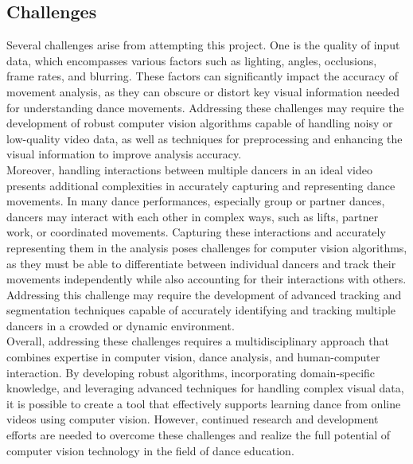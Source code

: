 \subsection{Challenges}
\indent Several challenges arise from attempting this project. One is the quality of input data, which 
encompasses various factors such as lighting, angles, occlusions, frame rates, and blurring. These 
factors can significantly impact the accuracy of movement analysis, as they can obscure or distort 
key visual information needed for understanding dance movements. Addressing these challenges may 
require the development of robust computer vision algorithms capable of handling noisy or low-quality 
video data, as well as techniques for preprocessing and enhancing the visual information to improve 
analysis accuracy.
\\
\indent Moreover, handling interactions between multiple dancers in an ideal video presents additional 
complexities in accurately capturing and representing dance movements. In many dance performances, 
especially group or partner dances, dancers may interact with each other in complex ways, such as 
lifts, partner work, or coordinated movements. Capturing these interactions and accurately 
representing them in the analysis poses challenges for computer vision algorithms, as they must be 
able to differentiate between individual dancers and track their movements independently while also 
accounting for their interactions with others. Addressing this challenge may require the development 
of advanced tracking and segmentation techniques capable of accurately identifying and tracking 
multiple dancers in a crowded or dynamic environment.
\\
\indent Overall, addressing these challenges requires a multidisciplinary approach that combines expertise 
in computer vision, dance analysis, and human-computer interaction. By developing robust algorithms, 
incorporating domain-specific knowledge, and leveraging advanced techniques for handling complex 
visual data, it is possible to create a tool that effectively supports learning dance from online 
videos using computer vision. However, continued research and development efforts are needed to 
overcome these challenges and realize the full potential of computer vision technology in the 
field of dance education.

